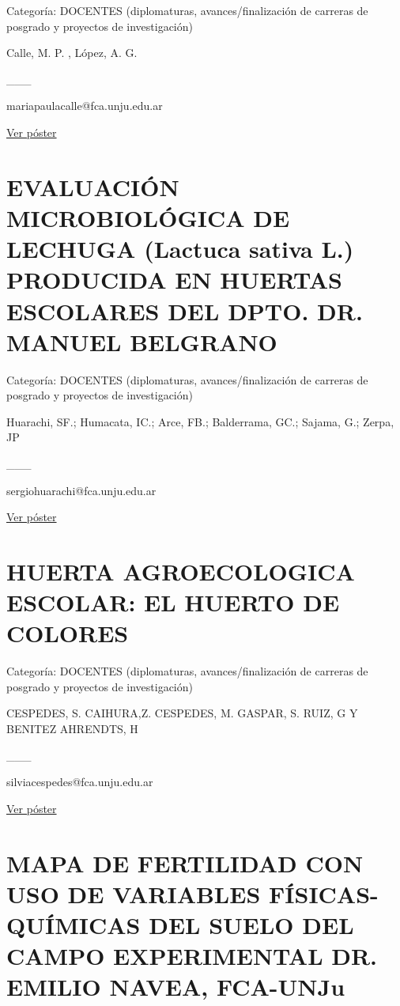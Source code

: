 \documentclass[
  spanish,
  letterpaper,
  DIV=11,
  numbers=noendperiod]{scrreprt}
\begin{document}
Categoría: DOCENTES (diplomaturas, avances/finalización de carreras de
posgrado y proyectos de investigación)

Calle, M. P. , López, A. G.

\_\_\_

mariapaulacalle@fca.unju.edu.ar

\href{https://drive.google.com/open?id=1RoVhZcw5X2DAK01YKFlN8td1suXsKI_A}{Ver
póster}

\section{EVALUACIÓN MICROBIOLÓGICA DE LECHUGA (Lactuca sativa L.)
PRODUCIDA EN HUERTAS ESCOLARES DEL DPTO. DR. MANUEL
BELGRANO}\label{evaluaciuxf3n-microbioluxf3gica-de-lechuga-lactuca-sativa-l.-producida-en-huertas-escolares-del-dpto.-dr.-manuel-belgrano}

Categoría: DOCENTES (diplomaturas, avances/finalización de carreras de
posgrado y proyectos de investigación)

Huarachi, SF.; Humacata, IC.; Arce, FB.; Balderrama, GC.; Sajama, G.;
Zerpa, JP

\_\_\_

sergiohuarachi@fca.unju.edu.ar

\href{https://drive.google.com/open?id=1b5cEYP4Im8mrCu5Kwc_-PTn8WCMXiAIb}{Ver
póster}

\section{HUERTA AGROECOLOGICA ESCOLAR: EL HUERTO DE
COLORES}\label{huerta-agroecologica-escolar-el-huerto-de-colores}

Categoría: DOCENTES (diplomaturas, avances/finalización de carreras de
posgrado y proyectos de investigación)

CESPEDES, S. CAIHURA,Z. CESPEDES, M. GASPAR, S. RUIZ, G Y BENITEZ
AHRENDTS, H

\_\_\_

silviacespedes@fca.unju.edu.ar

\href{https://drive.google.com/open?id=1dggH6kFMzYeFFmX29Jil08LDrX4K1ogJ}{Ver
póster}

\section{MAPA DE FERTILIDAD CON USO DE VARIABLES FÍSICAS-QUÍMICAS DEL
SUELO DEL CAMPO EXPERIMENTAL DR. EMILIO NAVEA,
FCA-UNJu}\label{mapa-de-fertilidad-con-uso-de-variables-fuxedsicas-quuxedmicas-del-suelo-del-campo-experimental-dr.-emilio-navea-fca-unju}
\end{document}
